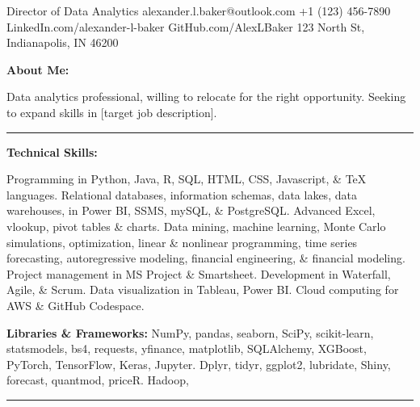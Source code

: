 \documentclass[letterpaper]{cream_class}
\begin{document}
       {Director of Data Analytics}
       {alexander.l.baker@outlook.com}
       {+1 (123) 456-7890}
       {LinkedIn.com/alexander-l-baker}
       {GitHub.com/AlexLBaker}
       {123 North St, Indianapolis, IN 46200}

\noindent\textcolor{burgundy}{\textbf{\large About Me:}}

Data analytics professional, willing to relocate for the right opportunity. Seeking to expand skills in [target job description].

\vspace{6pt}
  \hrule
  \vspace{6pt}

\noindent\textcolor{burgundy}{\textbf{\large Technical Skills:}}

Programming in Python, Java, R, SQL, HTML, CSS, Javascript, \& TeX languages. Relational databases, information schemas, data lakes, data warehouses, in Power BI, SSMS, mySQL, \& PostgreSQL. Advanced Excel, vlookup, pivot tables \& charts. Data mining, machine learning, Monte Carlo simulations, optimization, linear \& nonlinear programming, time series forecasting, autoregressive modeling, financial engineering, \& financial modeling. Project management in MS Project \& Smartsheet. Development in Waterfall, Agile, \& Scrum. Data visualization in Tableau, Power BI. Cloud computing for AWS \& GitHub Codespace.

\textbf{Libraries \& Frameworks:} NumPy, pandas, seaborn, SciPy, scikit-learn, statsmodels, bs4, requests, yfinance, matplotlib, SQLAlchemy, XGBoost, PyTorch, TensorFlow, Keras, Jupyter. Dplyr, tidyr, ggplot2, lubridate, Shiny, forecast, quantmod, priceR. Hadoop,

\vspace{6pt}
  \hrule
  \vspace{6pt}
  
\end{document}
